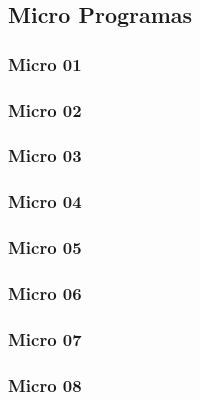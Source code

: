 \documentclass[12pt,a4paper,twoside]{report}
\begin{document}
\subsection{Micro Programas}
\subsubsection{Micro 01}


\subsubsection{Micro 02}


\subsubsection{Micro 03}


\subsubsection{Micro 04}


\subsubsection{Micro 05}


\subsubsection{Micro 06}


\subsubsection{Micro 07}


\subsubsection{Micro 08}

\end{document}
